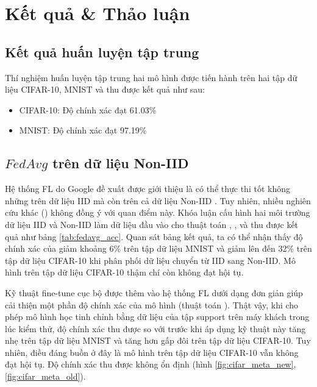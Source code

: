 \chapter{Kết quả \& Thảo luận}
\label{Chapter5}

\section{Kết quả huấn luyện tập trung}

Thí nghiệm huấn luyện tập trung hai mô hình được tiến hành trên hai tập dữ liệu CIFAR-10, MNIST và thu được kết quả như sau:

\begin{itemize}
    \item CIFAR-10: Độ chính xác đạt 61.03\%
    \item MNIST: Độ chính xác đạt 97.19\%
\end{itemize}

\section{$FedAvg$ trên dữ liệu Non-IID}

Hệ thống FL do Google đề xuất được giới thiệu là có thể thực thi tốt không những trên dữ liệu IID mà còn trên cả dữ liệu Non-IID \cite{mcmahan2017communication}. Tuy nhiên, nhiều nghiên cứu khác (\parencite{chen2018federated, zhao2018federated, zhu2021federated, wang2019federated}) không đồng ý với quan điểm này. Khóa luận cấu hình hai môi trường dữ liệu IID và Non-IID làm dữ liệu đầu vào cho thuật toán , ,  và thu được kết quả như bảng \ref{tab:fedavg_acc}. Quan sát bảng kết quả, ta có thể nhận thấy độ chính xác của  giảm khoảng 6\% trên tập dữ liệu MNIST và giảm lên đến 32\% trên tập dữ liệu CIFAR-10 khi phân phối dữ liệu chuyển từ IID sang Non-IID. Mô hình trên tập dữ liệu CIFAR-10 thậm chí còn không đạt hội tụ.

Kỹ thuật fine-tune cục bộ được thêm vào hệ thống FL dưới dạng đơn giản giúp cải thiện một phần độ chính xác của mô hình (thuật toán ). Thật vậy, khi cho phép mô hình học tinh chỉnh bằng dữ liệu của tập support trên máy khách trong lúc kiểm thử, độ chính xác thu được so với trước khi áp dụng kỹ thuật này tăng nhẹ trên tập dữ liệu MNIST và tăng hơn gấp đôi trên tập dữ liệu CIFAR-10. Tuy nhiên, điều đáng buồn ở đây là mô hình trên tập dữ liệu CIFAR-10 vẫn không đạt hội tụ. Độ chính xác thu được không ổn định (hình \ref{fig:cifar_meta_new}, \ref{fig:cifar_meta_old}).

